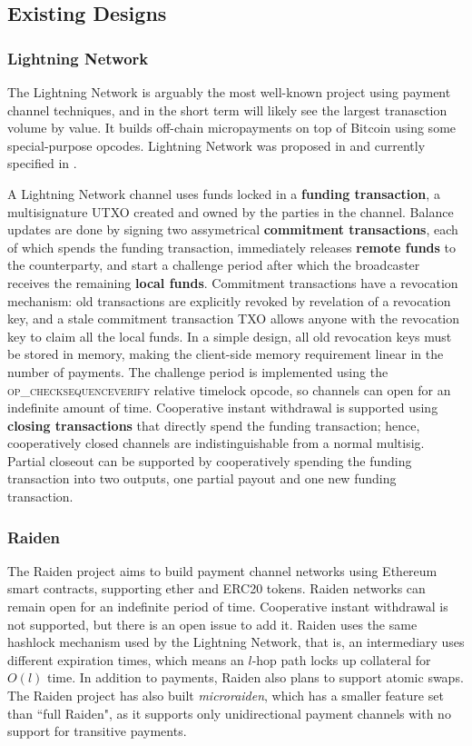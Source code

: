 \documentclass[prb,floatfix,reprint,nofootinbib,amsmath,amssymb,epsfig,pre,floats,letterpaper,groupedaffiliation,tightenlines,allcolors=blue,11pt]{revtex4}
\theoremstyle{definition}
\theoremstyle{definition}
\theoremstyle{definition}
\begin{document}
\subsection{Existing Designs}

\subsubsection{Lightning Network}

The Lightning Network is arguably the most well-known project using payment channel techniques, and in the short term will likely see the largest tranasction volume by value. It builds off-chain micropayments on top of Bitcoin using some special-purpose opcodes. Lightning Network was proposed in \cite{Poon_2016} and currently specified in \cite{Lightning_RFC}.

A Lightning Network channel uses funds locked in a \textbf{funding transaction}, a multisignature UTXO created and owned by the parties in the channel. Balance updates are done by signing two assymetrical \textbf{commitment transactions}, each of which spends the funding transaction, immediately releases \textbf{remote funds} to the counterparty, and start a challenge period after which the broadcaster receives the remaining \textbf{local funds}. Commitment transactions have a revocation mechanism: old transactions are explicitly revoked by revelation of a revocation key, and a stale commitment transaction TXO allows anyone with the revocation key to claim all the local funds. In a simple design, all old revocation keys must be stored in memory, making the client-side memory requirement linear in the number of payments. The challenge period is implemented using the \textsc{op\_checksequenceverify} relative timelock opcode, so channels can open for an indefinite amount of time. Cooperative instant withdrawal is supported using \textbf{closing transactions} that directly spend the funding transaction; hence, cooperatively closed channels are indistinguishable from a normal multisig. Partial closeout can be supported by cooperatively spending the funding transaction into two outputs, one partial payout and one new funding transaction.

\subsubsection{Raiden}

The Raiden project \cite{readthedocs:raidenspec} aims to build payment channel networks using Ethereum smart contracts, supporting ether and ERC20 tokens. Raiden networks can remain open for an indefinite period of time. Cooperative instant withdrawal is not supported, but there is an open issue to add it. Raiden uses the same hashlock mechanism used by the Lightning Network, that is, an intermediary uses different expiration times, which means an $l$-hop path locks up collateral for $O(l)$ time. In addition to payments, Raiden also plans to support atomic swaps. The Raiden project has also built \textit{microraiden}, which has a smaller feature set than ``full Raiden", as it supports only unidirectional payment channels with no support for transitive payments.
\end{document}
